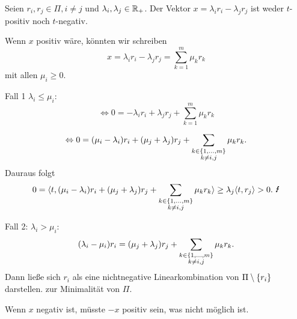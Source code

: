 \documentclass[18pt]{beamer}
\begin{document}
\begin{frame}
    \begin{satz} %
        Seien \( r_i, r_j \in \Pi, i \neq j \) und 
        \( \lambda_i, \lambda_j \in \mathbb{R}_+ \). 
        Der Vektor \( x = \lambda_i r_i - \lambda_j r_j \) 
        ist weder \( t \)-positiv noch \( t \)-negativ.
    \end{satz}
\end{frame}

\begin{frame}
    \begin{bew}
        Wenn \(x\) positiv wäre, könnten 
        wir schreiben 
        \[ x = \lambda_i r_i - \lambda_j r_j 
        = \sum_{k=1}^m \mu_k r_k \]
        mit allen \( \mu_i \geq 0 \). \pause

        Fall 1 \( \lambda_i \leq \mu_i \):
        \[ \Leftrightarrow 0 
        = - \lambda_i r_i + \lambda_j r_j 
        + \sum_{k=1}^m \mu_k r_k \]
        
        \renewcommand{\qedsymbol}{}
    \end{bew}
\end{frame}

\begin{frame}
    \begin{bew}
        \[ \Leftrightarrow 0 = (\mu_i - \lambda_i)
        r_i + (\mu_j + \lambda_j) 
        r_j + 
        \sum_{
            \substack{k \in \{1,\ldots, m\}\\k \neq i,j}}
        \mu_k r_k. \] \pause
        Dauraus folgt 
        \[ 0 = \scalarprod{t}{ 
            (\mu_i - \lambda_i) r_i + (\mu_j + \lambda_j) r_j 
        + \sum_{\substack{k \in \set{1,\ldots, m}\\k \neq i,j}}
        \mu_k r_k
        } \geq \lambda_j \scalarprod{t}{r_j} > 0. 
        \text{ \Lightning} \]

        \renewcommand{\qedsymbol}{}
    \end{bew}
\end{frame}

\begin{frame}
    \begin{bew}
        Fall 2: \( \lambda_i > \mu_i \): 
        \[ (\lambda_i - \mu_i) r_i
        = (\mu_j + \lambda_j) r_j 
        + \sum_{\substack{k \in \{1,\ldots, m\}\\k \neq i,j}}
        \mu_k r_k. \]
        Dann ließe sich \( r_i \) als eine 
        nichtnegative Linearkombination von 
        \( \Pi \setminus \{r_i\} \) darstellen. 
        \Lightning{} zur Minimalität von 
        \( \Pi \).

        Wenn \( x \) negativ ist, müsste \( -x \) 
        positiv sein, was nicht möglich ist.
    \end{bew}
\end{frame}
\end{document}
